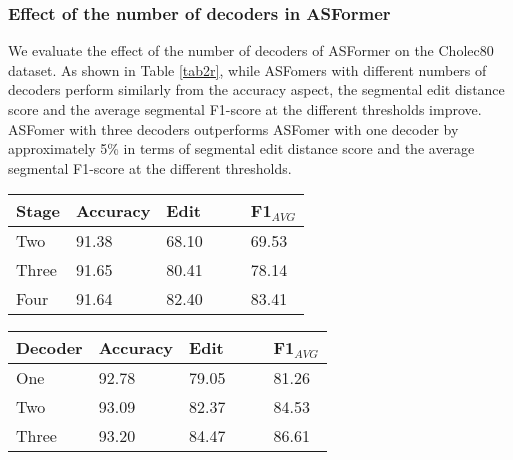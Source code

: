 \documentclass[sn-mathphys,Numbered]{sn-jnl}
\theoremstyle{thmstyleone}\newtheorem{theorem}{Theorem}\newtheorem{proposition}[theorem]{Proposition}
\theoremstyle{thmstyletwo}\newtheorem{example}{Example}\newtheorem{remark}{Remark}
\theoremstyle{thmstylethree}\newtheorem{definition}{Definition}
\begin{document}
\subsubsection{Effect of the number of decoders in ASFormer}

We evaluate the effect of the number of decoders of ASFormer on the Cholec80 dataset. As shown in Table \ref{tab2r}, while ASFomers with different numbers of decoders perform similarly from the accuracy aspect,  the segmental edit distance score and the average segmental F1-score at the different thresholds improve. ASFomer with three decoders outperforms ASFomer with one decoder by approximately 5\% in terms of segmental edit distance score and the average segmental F1-score at the different thresholds. 

\begin{minipage}[t]{0.45\textwidth}
\centering
\fontsize{8}{10}\selectfont
{}\label{tab1r}
\begin{tabular}[b]{llll}
\toprule
Stage & Accuracy & Edit & F1$_{AVG}$ \\
\midrule
Two &91.38    &68.10    &69.53 \\
Three &91.65   &80.41    &78.14 \\
Four &91.64    &82.40    &83.41 \\
\bottomrule \end{tabular}
\end{minipage}
\hfill
\begin{minipage}[t]{0.45\textwidth}
\centering
\fontsize{8}{10}\selectfont
{}\label{tab2r}
\begin{tabular}[b]{llll}
\toprule
Decoder & Accuracy & Edit & F1$_{AVG}$ \\
\midrule
One &92.78    &79.05    &81.26 \\
Two &93.09   &82.37    &84.53 \\
Three &93.20    &84.47    &86.61 \\
\bottomrule \end{tabular}
\end{minipage}
\end{document}
